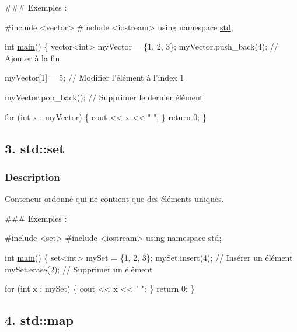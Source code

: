 \#\#\# Exemples \+: 
\begin{DoxyCode}
\textcolor{preprocessor}{#include <vector>}
\textcolor{preprocessor}{#include <iostream>}
\textcolor{keyword}{using namespace }\hyperlink{namespacestd}{std};

\textcolor{keywordtype}{int} \hyperlink{htop_8c_a3c04138a5bfe5d72780bb7e82a18e627}{main}() \{
    vector<int> myVector = \{1, 2, 3\};
    myVector.push\_back(4); \textcolor{comment}{// Ajouter à la fin}

    myVector[1] = 5; \textcolor{comment}{// Modifier l'élément à l'index 1}

    myVector.pop\_back(); \textcolor{comment}{// Supprimer le dernier élément}

    \textcolor{keywordflow}{for} (\textcolor{keywordtype}{int} x : myVector) \{
        cout << x << \textcolor{stringliteral}{" "};
    \}
    \textcolor{keywordflow}{return} 0;
\}
\end{DoxyCode}




\subsection*{3. std\+::set}

\subsubsection*{Description}

Conteneur ordonné qui ne contient que des éléments uniques.

\#\#\# Exemples \+: 
\begin{DoxyCode}
\textcolor{preprocessor}{#include <set>}
\textcolor{preprocessor}{#include <iostream>}
\textcolor{keyword}{using namespace }\hyperlink{namespacestd}{std};

\textcolor{keywordtype}{int} \hyperlink{htop_8c_a3c04138a5bfe5d72780bb7e82a18e627}{main}() \{
    set<int> mySet = \{1, 2, 3\};
    mySet.insert(4); \textcolor{comment}{// Insérer un élément}
    mySet.erase(2); \textcolor{comment}{// Supprimer un élément}

    \textcolor{keywordflow}{for} (\textcolor{keywordtype}{int} x : mySet) \{
        cout << x << \textcolor{stringliteral}{" "};
    \}
    \textcolor{keywordflow}{return} 0;
\}
\end{DoxyCode}




\subsection*{4. std\+::map}

